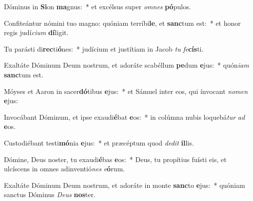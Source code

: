 \item Dóminus in \textbf{Si}on \textbf{ma}gnus:~* et excélsus super \textit{om}\textit{nes} \textbf{pó}pulos.
\item Confiteántur nómini tuo magno: quóniam terríbi\textbf{le}, et \textbf{sanc}tum est:~* et honor regis judí\textit{ci}\textit{um} \textbf{dí}ligit.
\item Tu parásti di\textbf{rec}ti\textbf{ó}nes:~* judícium et justítiam in Jacob \textit{tu} \textit{fe}\textbf{cís}ti.
\item Exaltáte Dóminum Deum nostrum, et adoráte scabéllum \textbf{pe}dum \textbf{e}jus:~* quón\textit{i}\textit{am} \textbf{sanc}tum est.
\item Móyses et Aaron in sacer\textbf{dó}tibus \textbf{e}jus:~* et Sámuel inter eos, qui ínvocant \textit{no}\textit{men} \textbf{e}jus:
\item Invocábant Dóminum, et ipse exaudi\textbf{é}bat \textbf{e}os:~* in colúmna nubis loquebá\textit{tur} \textit{ad} \textbf{e}os.
\item Custodiébant testi\textbf{mó}nia \textbf{e}jus:~* et præcéptum quod \textit{de}\textit{dit} \textbf{il}lis.
\item Dómine, Deus noster, tu exaudi\textbf{é}bas \textbf{e}os:~* Deus, tu propítius fuísti eis, et ulcíscens in omnes adinventió\textit{nes} \textit{e}\textbf{ó}rum.
\item Exaltáte Dóminum Deum nostrum, et adoráte in monte \textbf{sanc}to \textbf{e}jus:~* quóniam sanctus Dóminus \textit{De}\textit{us} \textbf{nos}ter.
